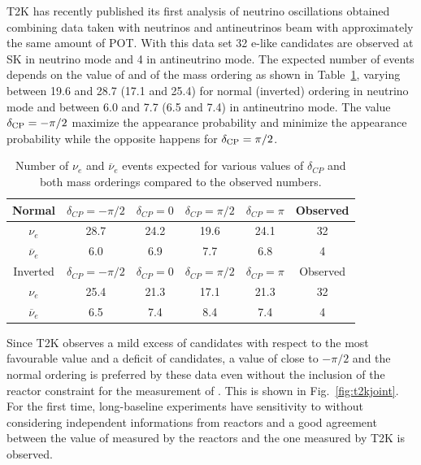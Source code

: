 T2K has recently published its first analysis of neutrino oscillations obtained combining data taken with neutrinos and antineutrinos beam with approximately the same amount of POT\cite{t2k2016}. With this data set 32 e-like candidates are observed at SK in neutrino mode and 4 in antineutrino mode. The expected number of events depends on the value of \dcp and of the mass ordering as shown in Table~\ref{tab:evtnue}, varying between 19.6 and 28.7 (17.1 and 25.4) for normal (inverted) ordering in neutrino mode and between 6.0 and 7.7 (6.5 and 7.4) in antineutrino mode. The value $\delta_{\mathrm{CP}}=-\pi/2$ maximize the \nue appearance probability and minimize the \nueb appearance probability while the opposite happens for $\delta_{\mathrm{CP}}=\pi/2$. 

\begin{table}[htbp]
    \centering
    \caption{Number of $\nu_e$ and $\overline{\nu}_e$ events expected for various values of $\delta_{CP}$ and both mass orderings 
    compared to the observed numbers.}
    \label{tab:evtnue}
    \begin{tabular}{|c|c|c|c|c|c|}
        \hline
        Normal & $\delta_{CP}= -\pi/2$ & $\delta_{CP}= 0 $ & $\delta_{CP}= \pi/2$ &  $\delta_{CP}= \pi$  & Observed\\
        \hline 
        $\nu_e$ &   28.7 & 24.2& 19.6& 24.1& 32 \\
        $\overline{\nu}_e$ &  6.0 &6.9& 7.7 &6.8 &4 \\     
        \hline
        \hline
        Inverted & $\delta_{CP}= -\pi/2$ & $\delta_{CP}= 0 $ & $\delta_{CP}= \pi/2$ &  $\delta_{CP}= \pi$  & Observed\\
        \hline 
        $\nu_e$ 			& 25.4 	& 21.3	& 17.1	& 21.3	& 32 \\
        $\overline{\nu}_e$ 	& 6.5 	& 7.4		& 8.4		& 7.4		&4 \\    
\hline
    \end{tabular}
\end{table}


Since T2K observes a mild excess of \nue candidates with respect to the most favourable value and a deficit of \nueb candidates, a value of \dcp close to $-\pi/2$ and the normal ordering is preferred by these data even without the inclusion of the reactor constraint for the measurement of \thint. This is shown in Fig.~\ref{fig:t2kjoint}. For the first time, long-baseline experiments have sensitivity to \dcp without considering independent informations from reactors and a good agreement between the value of \thint measured by the reactors and the one measured by T2K is observed. 

